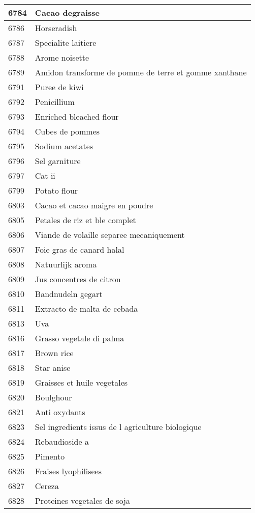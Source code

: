 \begin{longtable}{|l|l|}
6784 & Cacao degraisse \\ \hline 
6786 & Horseradish \\ \hline 
6787 & Specialite laitiere \\ \hline 
6788 & Arome noisette \\ \hline 
6789 & Amidon transforme de pomme de terre et gomme xanthane \\ \hline 
6791 & Puree de kiwi \\ \hline 
6792 & Penicillium \\ \hline 
6793 & Enriched bleached flour \\ \hline 
6794 & Cubes de pommes \\ \hline 
6795 & Sodium acetates \\ \hline 
6796 & Sel garniture \\ \hline 
6797 & Cat ii \\ \hline 
6799 & Potato flour \\ \hline 
6803 & Cacao et cacao maigre en poudre \\ \hline 
6805 & Petales de riz et ble complet \\ \hline 
6806 & Viande de volaille separee mecaniquement \\ \hline 
6807 & Foie gras de canard halal \\ \hline 
6808 & Natuurlijk aroma \\ \hline 
6809 & Jus concentres de citron \\ \hline 
6810 & Bandnudeln gegart \\ \hline 
6811 & Extracto de malta de cebada \\ \hline 
6813 & Uva \\ \hline 
6816 & Grasso vegetale di palma \\ \hline 
6817 & Brown rice \\ \hline 
6818 & Star anise \\ \hline 
6819 & Graisses et huile vegetales \\ \hline 
6820 & Boulghour \\ \hline 
6821 & Anti oxydants \\ \hline 
6823 & Sel ingredients issus de l agriculture biologique \\ \hline 
6824 & Rebaudioside a \\ \hline 
6825 & Pimento \\ \hline 
6826 & Fraises lyophilisees \\ \hline 
6827 & Cereza \\ \hline 
6828 & Proteines vegetales de soja \\ \hline 

\end{longtable}
